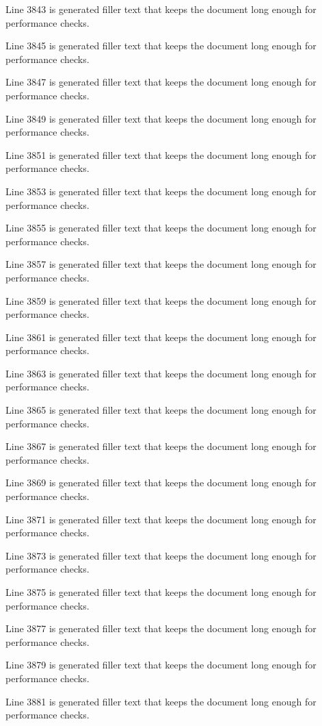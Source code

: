 Line 3843 is generated filler text that keeps the document long enough for performance checks.

Line 3845 is generated filler text that keeps the document long enough for performance checks.

Line 3847 is generated filler text that keeps the document long enough for performance checks.

Line 3849 is generated filler text that keeps the document long enough for performance checks.

Line 3851 is generated filler text that keeps the document long enough for performance checks.

Line 3853 is generated filler text that keeps the document long enough for performance checks.

Line 3855 is generated filler text that keeps the document long enough for performance checks.

Line 3857 is generated filler text that keeps the document long enough for performance checks.

Line 3859 is generated filler text that keeps the document long enough for performance checks.

Line 3861 is generated filler text that keeps the document long enough for performance checks.

Line 3863 is generated filler text that keeps the document long enough for performance checks.

Line 3865 is generated filler text that keeps the document long enough for performance checks.

Line 3867 is generated filler text that keeps the document long enough for performance checks.

Line 3869 is generated filler text that keeps the document long enough for performance checks.

Line 3871 is generated filler text that keeps the document long enough for performance checks.

Line 3873 is generated filler text that keeps the document long enough for performance checks.

Line 3875 is generated filler text that keeps the document long enough for performance checks.

Line 3877 is generated filler text that keeps the document long enough for performance checks.

Line 3879 is generated filler text that keeps the document long enough for performance checks.

Line 3881 is generated filler text that keeps the document long enough for performance checks.

